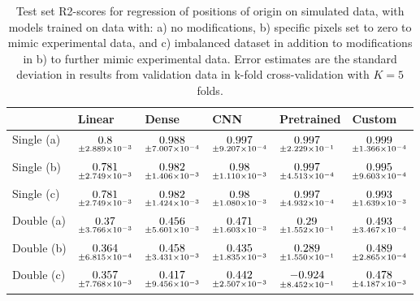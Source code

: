 \begin{table}
\centering
\caption{
Test set R2-scores for regression of positions of origin on simulated data, with models trained on data with: 
a) no modifications, b) specific pixels set to zero to mimic experimental data, and c) imbalanced dataset
in addition to modifications in b) to further mimic experimental data. Error estimates are the standard deviation 
in results from validation data in k-fold cross-validation with $K=5$ folds.
}
\label{tab:regression-simulated-all-positions-r2}
\begin{tabular}{llllll}
\toprule
{} &                                              Linear &                                               Dense &                                                 CNN &                                           Pretrained &                                              Custom \\
\midrule
Single (a) &  $\underset{\num{+- 2.889e-03 }  }{\num{ 0.8 } }$ &  $\underset{\num{+- 7.007e-04 }  }{\num{ 0.988 } }$ &  $\underset{\num{+- 9.207e-04 }  }{\num{ 0.997 } }$ &  $\underset{\num{+- 2.229e-01 }  }{\num{ 0.997 } }$ &  $\underset{\num{+- 1.366e-04 }  }{\num{ 0.999 } }$ \\
Single (b) &  $\underset{\num{+- 2.749e-03 }  }{\num{ 0.781 } }$ &  $\underset{\num{+- 1.406e-03 }  }{\num{ 0.982 } }$ &  $\underset{\num{+- 1.110e-03 }  }{\num{ 0.98 } }$ &  $\underset{\num{+- 4.513e-04 }  }{\num{ 0.997 } }$ &  $\underset{\num{+- 9.603e-04 }  }{\num{ 0.995 } }$ \\
Single (c) &  $\underset{\num{+- 2.749e-03 }  }{\num{ 0.781 } }$ &  $\underset{\num{+- 1.424e-03 }  }{\num{ 0.982 } }$ &  $\underset{\num{+- 1.080e-03 }  }{\num{ 0.98 } }$ &  $\underset{\num{+- 4.932e-04 }  }{\num{ 0.997 } }$ &  $\underset{\num{+- 1.639e-03 }  }{\num{ 0.993 } }$ \\
Double (a) &  $\underset{\num{+- 3.766e-03 }  }{\num{ 0.37 } }$ &  $\underset{\num{+- 5.601e-03 }  }{\num{ 0.456 } }$ &  $\underset{\num{+- 1.603e-03 }  }{\num{ 0.471 } }$ &  $\underset{\num{+- 1.552e-01 }  }{\num{ 0.29 } }$ &  $\underset{\num{+- 3.467e-04 }  }{\num{ 0.493 } }$ \\
Double (b) &  $\underset{\num{+- 6.815e-04 }  }{\num{ 0.364 } }$ &  $\underset{\num{+- 3.431e-03 }  }{\num{ 0.458 } }$ &  $\underset{\num{+- 1.835e-03 }  }{\num{ 0.435 } }$ &  $\underset{\num{+- 1.550e-01 }  }{\num{ 0.289 } }$ &  $\underset{\num{+- 2.865e-04 }  }{\num{ 0.489 } }$ \\
Double (c) &  $\underset{\num{+- 7.768e-03 }  }{\num{ 0.357 } }$ &  $\underset{\num{+- 9.456e-03 }  }{\num{ 0.417 } }$ &  $\underset{\num{+- 2.507e-03 }  }{\num{ 0.442 } }$ &  $\underset{\num{+- 8.452e-01 }  }{\num{ -0.924 } }$ &  $\underset{\num{+- 4.187e-03 }  }{\num{ 0.478 } }$ \\
\bottomrule
\end{tabular}
\end{table}
